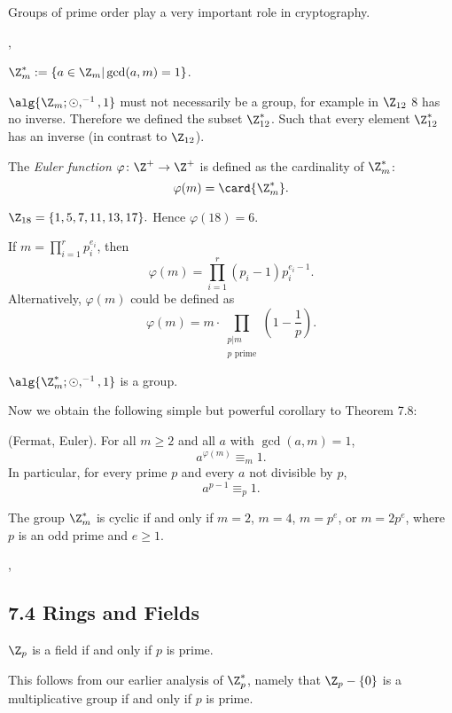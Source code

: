 \Com Groups of prime order play a very important role in cryptography.

\sep

 $\Z^*_m := \{a \in \Z_m | \gcd(a,m) = 1\}$.

\Com $\alg{\Z_m;\odot,^{-1},1}$ must not necessarily be a group, for example in
$\Z_{12}$ 8 has no inverse. Therefore we defined the subset $\Z_{12}^*$. Such
that every element  $\Z_{12}^*$ has an inverse (in contrast to $\Z_{12}$).

 The \emph{Euler function } $\varphi\colon \Z^+\to\Z^+$ is defined as
the cardinality of $\Z^*_m$:
\[
\varphi(m)=\card{\Z^*_m}.
\]

\Ex $\Z_{18}=\{1,5,7,11,13,17\}.$ Hence $\varphi(18)=6$.

 If $m=\prod_{i=1}^{r}p_i^{e_i}$, then
\[
\varphi(m)=\prod_{i=1}^{r}(p_i-1)p_i^{e_i-1}.
\]
Alternatively, $\varphi(m)$ could be defined as
\[
\varphi(m)=m\cdot \prod_{\substack{p|m\\p
\text{ prime}}}\left(1-\frac{1}{p}\right).
\]



 $\alg{\Z^*_m;\odot,^{-1},1}$ is a group.

Now we obtain the following simple but powerful corollary to Theorem 7.8:

 (Fermat, Euler). For all $m\geq 2$ and all $a$ with $\gcd(a,m)=1$,
\[
a^{\varphi(m)}\equiv_m 1.
\]
In particular, for every prime $p$ and every $a$ not divisible by $p$,
\[
a^{p-1}\equiv_p 1.
\]

 The group $\Z^*_m$ is cyclic if and only if $m=2$, $m=4$, $m=p^{e}$,
or $m=2p^e$, where $p$ is an odd prime and $e\geq 1$.

\sep


\subsection*{7.4 Rings and Fields}


\Thm $\Z_p$ is a field if and only if $p$ is prime.

\Proof This follows from our earlier analysis of $\Z^*_p$, namely that
$\Z_p-\{0\}$ is a multiplicative group if and only if $p$ is prime.

